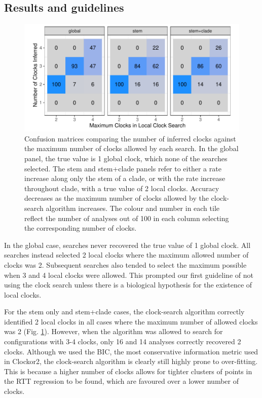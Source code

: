 \documentclass{article}
\begin{document}
\subsection*{Results and guidelines}
\begin{figure}[H]
\centering
\includegraphics[width = \linewidth]{inferredClocks.pdf}
\caption{{Confusion matrices comparing the number of inferred clocks against the maximum number of clocks allowed by each search. In the global panel, the true value is 1 global clock, which none of the searches selected.  The stem and stem+clade panels refer to either a rate increase along only the stem of a clade, or with the rate increase throughout clade, with a true value of 2 local clocks. Accuracy decreases as the maximum number of clocks allowed by the clock-search algorithm increases. The colour and number in each tile reflect the number of analyses out of 100 in each column selecting the corresponding number of clocks.}}
\label{fig:simStudy}
\end{figure}

{In the global case, searches never recovered the true value of 1 global clock. All searches instead selected 2 local clocks where the maximum allowed number of clocks was 2. Subsequent searches also tended to select the maximum possible when 3 and 4 local clocks were allowed. This prompted our first guideline of not using the clock search unless there is a biological hypothesis for the existence of local clocks.}

{For the stem only and stem+clade cases, the clock-search algorithm correctly identified 2 local clocks in all cases where the maximum number of allowed clocks was 2 (Fig. \ref{fig:simStudy}). However, when the algorithm was allowed to search for configurations with 3-4 clocks, only 16 and 14 analyses correctly recovered 2 clocks.}
Although we used the BIC, the most conservative information metric used in Clockor2, the clock-search algorithm is clearly still highly prone to over-fitting. This is because a higher number of clocks allows for tighter clusters of points in the RTT regression to be found, which are favoured over a lower number of clocks.
\end{document}
